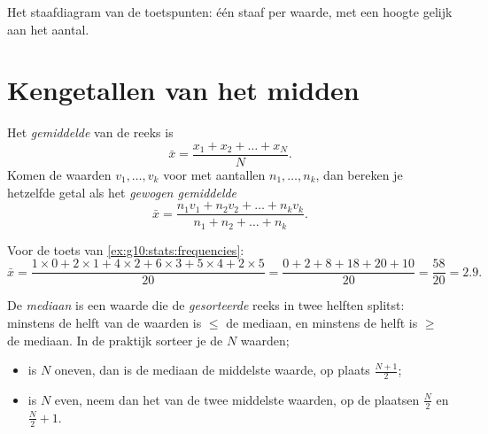 \begin{omfigure}

{\small Het staafdiagram van de toetspunten: één staaf per waarde, met een
hoogte gelijk aan het aantal.}
\end{omfigure}

\section{Kengetallen van het midden}

\begin{definition}[Gemiddelde]\label{def:g10:stats:mean}
Het \emph{gemiddelde} van de reeks is
\[
\bar x = \frac{x_1 + x_2 + \dots + x_N}{N}.
\]
Komen de waarden $v_1, \dots, v_k$ voor met aantallen $n_1, \dots, n_k$, dan
bereken je hetzelfde getal als het \emph{gewogen gemiddelde}
\[
\bar x = \frac{n_1 v_1 + n_2 v_2 + \dots + n_k v_k}{n_1 + n_2 + \dots + n_k}.
\]
\end{definition}

\begin{example}\label{ex:g10:stats:mean}
Voor de toets van \cref{ex:g10:stats:frequencies}:
\[
\bar x = \frac{1 \times 0 + 2 \times 1 + 4 \times 2 + 6 \times 3
+ 5 \times 4 + 2 \times 5}{20}
= \frac{0 + 2 + 8 + 18 + 20 + 10}{20}
= \frac{58}{20} = 2.9 .
\]
\end{example}

\begin{definition}[Mediaan]\label{def:g10:stats:median}
De \emph{mediaan} is een waarde die de \emph{gesorteerde}
reeks in twee helften splitst: minstens de helft van de waarden is $\leq$ de
mediaan, en minstens de helft is $\geq$ de mediaan. In de praktijk sorteer je
de $N$ waarden;
\begin{itemize}
  \item is $N$ oneven, dan is de mediaan de middelste waarde, op plaats
        $\frac{N+1}{2}$;
  \item is $N$ even, neem dan het  van de twee middelste waarden, op
        de plaatsen $\frac N2$ en $\frac N2 + 1$.
\end{itemize}
\end{definition}


